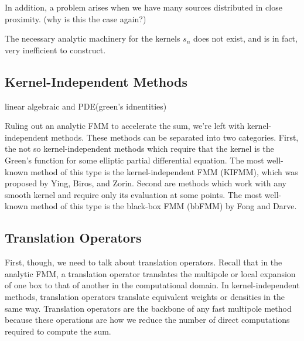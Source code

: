 \documentclass[11pt, oneside]{article}   	%
\begin{document}
In addition, a problem arises when we have many sources distributed in close proximity. (why is this the case again?)

The necessary analytic machinery for the kernels $s_n$ does not exist, and is in fact, very inefficient to construct.

\subsection{Kernel-Independent Methods}

linear algebraic and PDE(green's idnentities)

Ruling out an analytic FMM to accelerate the sum, we're left with kernel-independent methods. These methods can be separated into two categories. First, the not so kernel-independent methods which require that the kernel is the Green's function for some elliptic partial differential equation. The most well-known method of this type is the kernel-independent FMM (KIFMM), which was proposed by Ying, Biros, and Zorin. Second are methods which work with any smooth kernel and require only its evaluation at some points. The most well-known method of this type is the black-box FMM (bbFMM) by Fong and Darve.


\subsection{Translation Operators}
First, though, we need to talk about translation operators. Recall that in the analytic FMM, a translation operator translates the multipole or local expansion of one box to that of another in the computational domain. In kernel-independent methods, translation operators translate equivalent weights or densities in the same way. Translation operators are the backbone of any fast multipole method because these operations are how we reduce the number of direct computations required to compute the sum.
\end{document}
